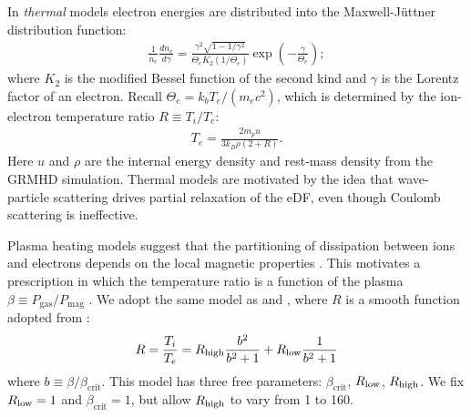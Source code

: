In \emph{thermal} models electron energies are distributed into the Maxwell-J{\"u}ttner distribution function:
\begin{align}
  \frac{1}{n_e}\frac{dn_e}{d\gamma} = \frac{\gamma^2 \sqrt{1-1/\gamma^2}} {\Theta_e K_2(1/\Theta_e)} \exp\left(-\frac{\gamma}{\Theta_e}\right);
\end{align}
where $K_2$ is the modified Bessel function of the second kind and $\gamma$ is the Lorentz factor of an electron. Recall $\Theta_e = k_b T_e/(m_e c^2)$, which is determined by the ion-electron temperature ratio $R \equiv T_i/T_e$:
\begin{align}
  T_e=\frac{2 m_p u}{3 k_B \rho (2+R)}.
\end{align}
Here $u$ and $\rho$ are the internal energy density and rest-mass density from the GRMHD simulation.
Thermal models are motivated by the idea that wave-particle scattering drives partial relaxation of the eDF, even though Coulomb scattering is ineffective.

Plasma heating models suggest that the partitioning of dissipation between ions and electrons depends on the local magnetic properties \citep[e.g.,][]{1999ApJ...520..248Q, 2010MNRAS.409L.104H, Kawazura771}.  This motivates a prescription in which the temperature ratio is a function of the plasma $\beta \equiv P_\mathrm{gas}/P_\mathrm{mag}$ \citep{2015ApJ...799....1C}.
We adopt the same model as  and , where $R$ is a smooth function adopted from \cite{2016A&A...586A..38M}:
\begin{equation}
  R = \frac{T_i}{T_e} = \Rh \frac{b^2}{b^2+1} + \Rl \frac{1}{b^2+1}
  \label{eq:rhigh_prescription}
\end{equation}
where $b \equiv \beta/\beta_\mathrm{crit}$.
This model has three free parameters: $\beta_\mathrm{crit}$, $R_\mathrm{low}$, $R_\mathrm{high}$.  We fix $R_\mathrm{low} = 1$ and $\beta_\mathrm{crit} = 1$, but allow $R_\mathrm{high}$ to vary from 1 to 160. %

